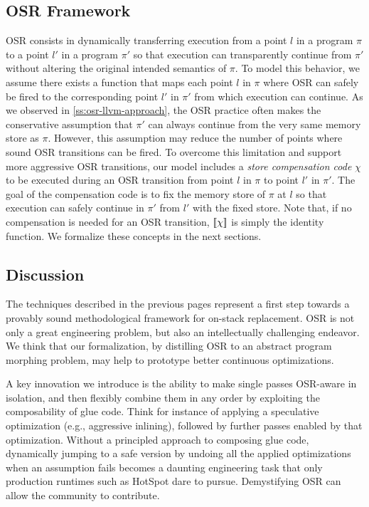 


\subsection{OSR Framework}
OSR consists in dynamically transferring execution from a point $l$ in a program $\pi$ to a point $l'$ in a program $\pi'$ so that execution can transparently continue from $\pi'$ without altering the original intended semantics of $\pi$. To model this behavior, we assume there exists a function that maps each point $l$ in $\pi$ where OSR can safely be fired to the corresponding point $l'$ in $\pi'$ from which execution can continue.
As we observed in \mysection\ref{ss:osr-llvm-approach}, the OSR practice often makes the conservative assumption that $\pi'$ can always continue from the very same memory store as $\pi$. However, this assumption may reduce the number of points where sound OSR transitions can be fired. To overcome this limitation and support more aggressive OSR transitions, our model includes a {\em store compensation code} $\chi$ to be executed during an OSR transition from point $l$ in $\pi$ to point $l'$ in $\pi'$. The goal of the compensation code is to fix the memory store of $\pi$ at $l$ so that execution can safely continue in $\pi'$ from $l'$ with the fixed store. Note that, if no compensation is needed for an OSR transition, $[\![\chi]\!]$ is simply the identity function. We formalize these concepts in the next sections.







\subsection{Discussion}
The techniques described in the previous pages represent a first step towards a provably sound methodological framework for on-stack replacement. OSR is not only a great engineering problem, but also an intellectually challenging endeavor. We think that our formalization, by distilling OSR to an abstract program morphing problem, may help to prototype better continuous optimizations.

A key innovation we introduce is the ability to make single passes OSR-aware in isolation, and then flexibly combine them in any order by exploiting the composability of glue code. Think for instance of applying a speculative optimization (e.g., aggressive inlining), followed by further passes enabled by that optimization. Without a principled approach to composing glue code, dynamically jumping to a safe version by undoing all the applied optimizations when an assumption fails becomes a daunting engineering task that only production runtimes such as HotSpot dare to pursue. Demystifying OSR can allow the community to contribute.

